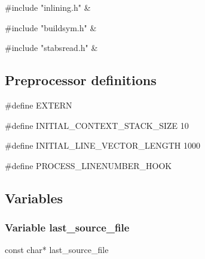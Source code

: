 \medskip
\begin{cxreftabi}
{\stt \#include "inlining.h"} &\\
\end{cxreftabi}

\medskip
\begin{cxreftabi}
{\stt \#include "buildsym.h"} &\\
\end{cxreftabi}

\medskip
\begin{cxreftabi}
{\stt \#include "stabsread.h"} &\\
\end{cxreftabi}


\subsection*{Preprocessor definitions}

{\stt \#define EXTERN}

\medskip
{\stt \#define INITIAL\_CONTEXT\_STACK\_SIZE 10}

\medskip
{\stt \#define INITIAL\_LINE\_VECTOR\_LENGTH 1000}

\medskip
{\stt \#define PROCESS\_LINENUMBER\_HOOK}


\subsection{Variables}


\subsubsection{Variable last\_source\_file}
\label{var_last_source_file_buildsym.c}

{\stt const char* last\_source\_file}

